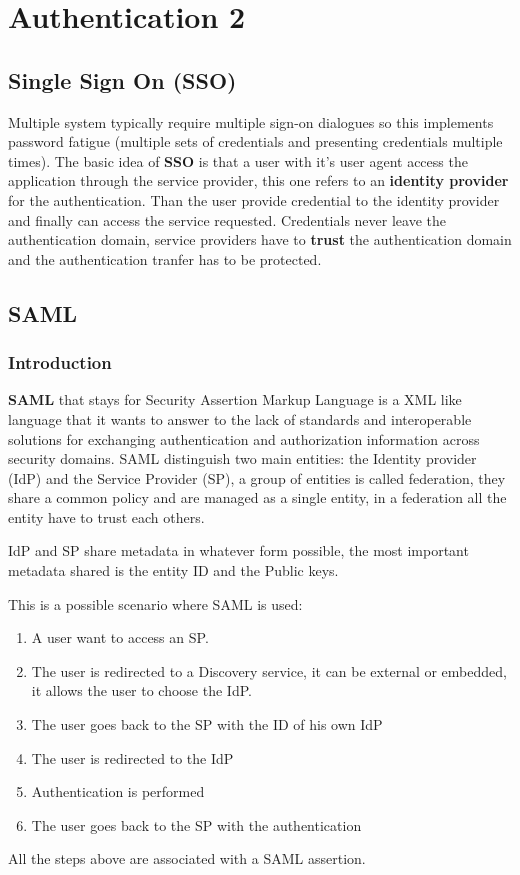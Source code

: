 \section{Authentication 2}
\subsection{Single Sign On (SSO)}
Multiple system typically require multiple sign-on dialogues so this implements password fatigue (multiple sets of credentials and presenting credentials multiple times). The basic idea of \textbf{SSO} is that a user with it's user agent access the application through the service provider, this one refers to an \textbf{identity provider} for the authentication. Than the user provide credential to the identity provider and finally can access the service requested. Credentials never leave the authentication domain, service providers have to \textbf{trust} the authentication domain and the authentication tranfer has to be protected.

\subsection{SAML}
\subsubsection{Introduction}
\textbf{SAML} that stays for Security Assertion Markup Language is a XML like language that it wants to answer to the lack of standards and interoperable solutions for exchanging authentication and authorization information across security domains. SAML distinguish two main entities: the Identity provider (IdP) and the Service Provider (SP), a group of entities is called federation, they share a common policy and are managed as a single entity, in a federation all the entity have to trust each others.

IdP and SP share metadata in whatever form possible, the most important metadata shared is the entity ID and the Public keys.

This is a possible scenario where SAML is used:
\begin{enumerate}
    \item A user want to access an SP.
    \item The user is redirected to a Discovery service, it can be external or embedded, it allows the user to choose the IdP.
    \item The user goes back to the SP with the ID of his own IdP
    \item The user is redirected to the IdP
    \item Authentication is performed
    \item The user goes back to the SP with the authentication
\end{enumerate}
All the steps above are associated with a SAML assertion. 
